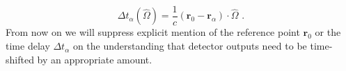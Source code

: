 \documentclass[11pt]{cuthesis}
\newcommand{\fs}{\text{ .}}
\begin{document}
\begin{equation}
\Delta t_\alpha (\hat{\Omega})=\frac{1}{c}(\textbf{r}_0-\textbf{r}_\alpha)\cdot\hat{\Omega} \fs
\end{equation}
From now on we will suppress explicit mention of the reference point $\textbf{r}_0$ or the time delay $\Delta t_\alpha$ on the understanding that detector outputs need to be time-shifted by an appropriate amount. 
\end{document}
